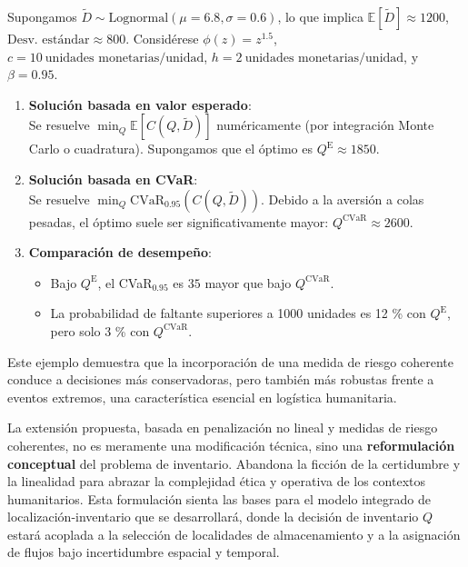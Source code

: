 \documentclass[
  spanish,
  us-letterpaper,
]{scrreprt}
\providecommand{\tightlist}{%
  \setlength{\itemsep}{0pt}\setlength{\parskip}{0pt}}
\numberwithin{equation}{section}
\begin{document}
Supongamos \(\tilde{D} \sim \text{Lognormal}(\mu = 6.8, \sigma = 0.6)\),
lo que implica \(\mathbb{E}[\tilde{D}] \approx 1200\),
\(\text{Desv. estándar} \approx 800\). Considérese
\(\phi(z) = z^{1.5}\), \(c = 10~\text{unidades monetarias/unidad}\),
\(h = 2~\text{unidades monetarias/unidad}\), y \(\beta = 0.95\).

\begin{enumerate}
\def\labelenumi{\arabic{enumi}.}
\item
  \textbf{Solución basada en valor esperado}:\\
  Se resuelve \(\min_Q \mathbb{E}[C(Q, \tilde{D})]\) numéricamente (por
  integración Monte Carlo o cuadratura). Supongamos que el óptimo es
  \(Q^{\text{E}} \approx 1850\).
\item
  \textbf{Solución basada en CVaR}:\\
  Se resuelve \(\min_Q \text{CVaR}_{0.95}(C(Q, \tilde{D}))\). Debido a
  la aversión a colas pesadas, el óptimo suele ser significativamente
  mayor: \(Q^{\text{CVaR}} \approx 2600\).
\item
  \textbf{Comparación de desempeño}:

  \begin{itemize}
  \tightlist
  \item
    Bajo \(Q^{\text{E}}\), el CVaR\(_{0.95}\) es \(35%
    \) mayor que bajo \(Q^{\text{CVaR}}\).\\
  \item
    La probabilidad de faltante superiores a 1000 unidades es 12 \% con
    \(Q^{\text{E}}\), pero solo 3 \% con \(Q^{\text{CVaR}}\).
  \end{itemize}
\end{enumerate}

Este ejemplo demuestra que la incorporación de una medida de riesgo
coherente conduce a decisiones más conservadoras, pero también más
robustas frente a eventos extremos, una característica esencial en
logística humanitaria.

La extensión propuesta, basada en penalización no lineal y medidas de
riesgo coherentes, no es meramente una modificación técnica, sino una
\textbf{reformulación conceptual} del problema de inventario. Abandona
la ficción de la certidumbre y la linealidad para abrazar la complejidad
ética y operativa de los contextos humanitarios. Esta formulación sienta
las bases para el modelo integrado de localización-inventario que se
desarrollará, donde la decisión de inventario \(Q\) estará acoplada a la
selección de localidades de almacenamiento y a la asignación de flujos
bajo incertidumbre espacial y temporal.
\end{document}
